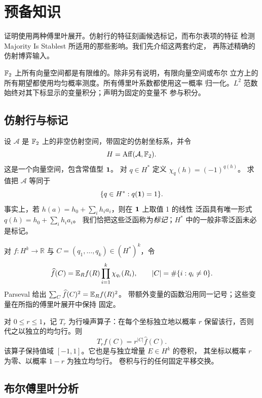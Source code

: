 \section{预备知识}\label{sec:preliminaries}

证明使用两种傅里叶展开。仿射行的特征刻画候选标记，而布尔表项的特征
检测 Majority Is Stablest 所适用的那些影响。我们先介绍这两套约定，
再陈述精确的仿射博弈输入。

$\mathbb F_2$ 上所有向量空间都是有限维的。除非另有说明，有限向量空间或布尔
立方上的所有期望都使用均匀概率测度。所有傅里叶系数都使用这一概率
归一化。$L^2$ 范数始终对其下标显示的变量积分；声明为固定的变量不
参与积分。

\subsection{仿射行与标记}

设 $\mathcal A$ 是 $\mathbb F_2$ 上的非空仿射空间，带固定的仿射坐标系，并令
\[
 H=\operatorname{Aff}(\mathcal A,\mathbb F_2).
\]
这是一个向量空间，包含常值型 $\mathbf 1$。
对 $q\in H^*$ 定义 $\chi_q(h)=(-1)^{q(h)}$。
求值把 $\mathcal A$ 等同于
\begin{equation}\label{eq:labels-dual}
 \{q\in H^*:q(\mathbf 1)=1\}.
\end{equation}
事实上，若 $h(a)=h_0+\sum_i h_i a_i$，则在 $\mathbf 1$ 上取值 1 的线性
泛函具有唯一形式 $q(h)=h_0+\sum_i h_i a_i$。
我们恰把这些泛函称为\emph{标记}；$H^*$ 中的一般非零泛函未必是标记。

对 $f:H^k\to\mathbb R$ 与 $C=(q_1,\ldots,q_k)\in(H^*)^k$，令
\[
 \widehat f(C)=\mathbb E_R f(R)\prod_{i=1}^k\chi_{q_i}(R_i),\qquad
 |C|=\#\{i:q_i\ne0\}.
\]
Parseval 给出 $\sum_C\widehat f(C)^2=\mathbb E_R f(R)^2$。
带额外变量的函数沿用同一记号；这些变量在所指的傅里叶展开中保持
固定。

对 $0\le r\le1$，记 $T_r$ 为行噪声算子：在每个坐标独立地以概率
$r$ 保留该行，否则代之以独立的均匀行。则
\begin{equation}\label{eq:row-noise}
 \widehat{T_rf}(C)=r^{|C|}\widehat f(C).
\end{equation}
该算子保持值域 $[-1,1]$。它也是与独立增量 $E\in H^k$ 的卷积，
其坐标以概率 $r$ 为零、以概率 $1-r$ 为独立均匀行。
卷积与行的任何固定平移交换。

\subsection{布尔傅里叶分析}

